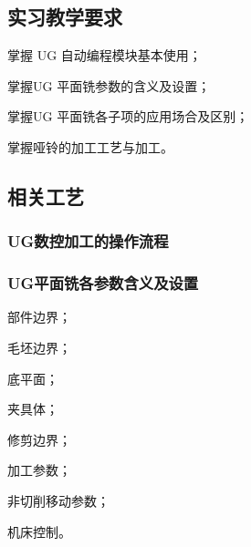 \jxhj{%
}

\makeshouye%

\subsection{实习教学要求}
\begin{compactenum}[1、]
\item 掌握 UG 自动编程模块基本使用；
\item 掌握UG 平面铣参数的含义及设置；
\item 掌握UG 平面铣各子项的应用场合及区别；
\item 掌握哑铃的加工工艺与加工。
\end{compactenum}

\subsection{相关工艺}
\subsubsection{UG数控加工的操作流程}
\subsubsection{UG平面铣各参数含义及设置}
\begin{compactenum}[1、]
\item 部件边界；
\item 毛坯边界；
\item 底平面；
\item 夹具体；
\item 修剪边界；
\item 加工参数；
\item 非切削移动参数；
\item       机床控制。
\end{compactenum}
